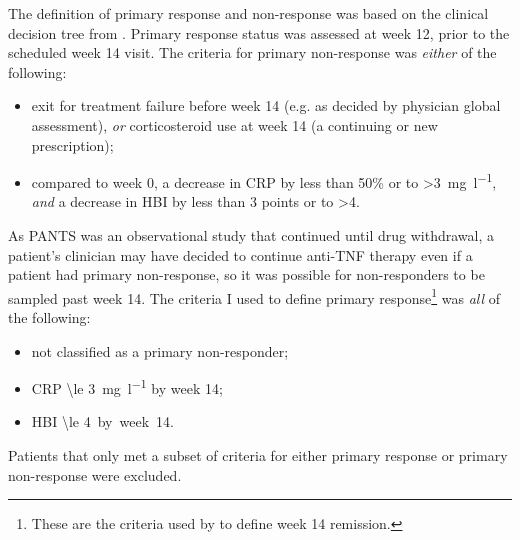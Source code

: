 The definition of primary response and non-response was based on the clinical decision tree from \textcite{kennedy2019PredictorsAntiTNFTreatment}.
Primary response status was assessed at week 12, prior to the scheduled week 14 visit. 
The criteria for primary non-response was \emph{either} of the following: 
\begin{itemize}
    \item exit for treatment failure before week 14 (e.g. as decided by physician global assessment), \emph{or} corticosteroid use at week 14 (a continuing or new prescription);
    \item compared to week 0, a decrease in \gls{CRP} by less than 50\% or to >\SI{3}{\milli\gram\per\litre}, \emph{and} a decrease in \gls{HBI} by less than 3 points or to >4.
\end{itemize}
As \gls{PANTS} was an observational study that continued until drug withdrawal, a patient's clinician may have decided to continue anti-\gls{TNF} therapy even if a patient had primary non-response, so it was possible for non-responders to be sampled past week 14.
The criteria I used to define primary response\footnote{These are the criteria used by \textcite{kennedy2019PredictorsAntiTNFTreatment} to define week 14 remission.} was \emph{all} of the following:
\begin{itemize}
    \item not classified as a primary non-responder;
    \item \gls{CRP} \SI{\le 3}{\milli\gram\per\litre} by week 14;
    \item \gls{HBI} \SI{\le 4} by week 14.
\end{itemize}
Patients that only met a subset of criteria for either primary response or primary non-response were excluded.


